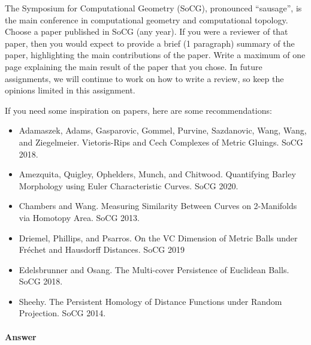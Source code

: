 \documentclass{article}
\begin{document}

The Symposium for Computational Geometry (SoCG), pronounced ``sausage'', is the
main conference in computational geometry and computational topology.
Choose a paper published in SoCG (any year).  If
you were a reviewer of that paper, then you would expect to provide a brief (1
paragraph) summary of the paper, highlighting the main contributions of the
paper.  Write a maximum of one page explaining the main result of the paper that
you chose.  In future assignments, we will continue to work on how to write a
review, so keep the opinions limited in this assignment.

If you need some inspiration on papers, here are some recommendations:
\begin{itemize}
    \item  Adamaszek, Adams,  Gasparovic, Gommel, Purvine, Sazdanovic,
        Wang, Wang, and Ziegelmeier. Vietoris-Rips and Cech Complexes of Metric
        Gluings. SoCG 2018.
    \item Amezquita, Quigley, Ophelders, Munch, and Chitwood.
        Quantifying Barley Morphology using Euler Characteristic Curves. SoCG
        2020.
    \item Chambers and Wang. Measuring Similarity Between Curves on 2-Manifolds
        via Homotopy Area. SoCG 2013.
    \item Driemel, Phillips, and Psarros.
        On the VC Dimension of Metric Balls under Fr\'echet and Hausdorff
        Distances. SoCG 2019
    \item Edelsbrunner and Osang. The Multi-cover Persistence of Euclidean
        Balls. SoCG 2018.
    \item Sheehy. The Persistent Homology of Distance Functions under Random
        Projection. SoCG 2014.
\end{itemize}

\paragraph{Answer}
\end{document}
